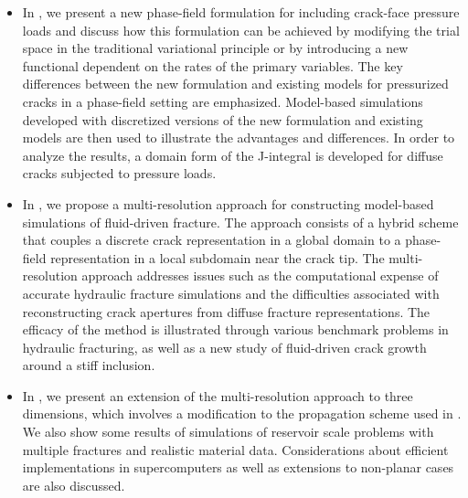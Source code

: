 \begin{itemize}
  \item %
        In , we present a new phase-field formulation for including crack-face pressure loads and discuss how this formulation can be achieved by modifying the trial space in the traditional variational principle or by introducing a new functional dependent on the rates of the primary variables. The key differences between the new formulation and existing models for pressurized cracks in a phase-field setting are emphasized. Model-based simulations developed with discretized versions of the new formulation and existing models are then used to illustrate the advantages and differences. In order to analyze the results, a domain form of the J-integral is developed for diffuse cracks subjected to pressure loads.
  \item %
        In , we propose a multi-resolution approach for constructing model-based simulations of fluid-driven fracture. The approach consists of a hybrid scheme that couples a discrete crack representation in a global domain to a phase-field representation in a local subdomain near the crack tip. The multi-resolution approach addresses issues such as the computational expense of accurate hydraulic fracture simulations and the difficulties associated with reconstructing crack apertures from diffuse fracture representations. The efficacy of the method is illustrated through various benchmark problems in hydraulic fracturing, as well as a new study of fluid-driven crack growth around a stiff inclusion.
  \item %
        In , we present an extension of the multi-resolution approach to three dimensions, which involves a modification to the propagation scheme used in . We also show some results of simulations of reservoir scale problems with multiple fractures and realistic material data. Considerations about efficient implementations in supercomputers as well as extensions to non-planar cases are also discussed.
\end{itemize}
